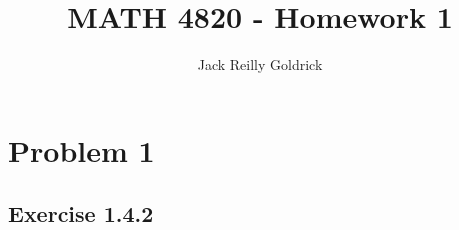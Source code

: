 \documentclass[]{report}
\title{MATH 4820 - Homework 1}
\author{Jack Reilly Goldrick}
\begin{document}
\maketitle


\section{Problem 1}

\subsection{Exercise 1.4.2}
\end{document}
